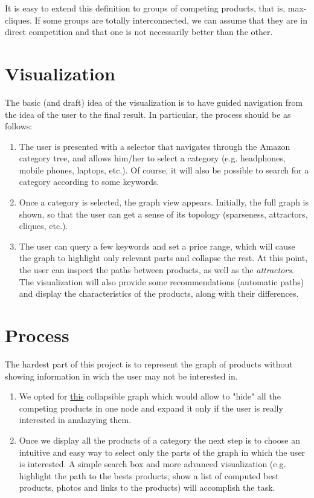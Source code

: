 \documentclass[a4paper,12pt]{article}
\begin{document}
It is easy to extend this definition to groups of competing products, that is, max-cliques. If some groups are totally interconnected, we can assume that they are in direct competition and that one is not necessarily better than the other.

\section{Visualization}
The basic (and draft) idea of the visualization is to have guided navigation from the idea of the user to the final result. In particular, the process should be as follows:
\begin{enumerate}
	\item The user is presented with a selector that navigates through the Amazon category tree, and allows him/her to select a category (e.g. headphones, mobile phones, laptops, etc.). Of course, it will also be possible to search for a category according to some keywords.
	\item Once a category is selected, the graph view appears. Initially, the full graph is shown, so that the user can get a sense of its topology (sparseness, attractors, cliques, etc.).
	\item The user can query a few keywords and set a price range, which will cause the graph to highlight only relevant parts and collapse the rest. At this point, the user can inspect the paths between products, as well as the \emph{attractors}. The visualization will also provide some recommendations (automatic paths) and display the characteristics of the products, along with their differences.
\end{enumerate}

\section{Process}
The hardest part of this project is to represent the graph of products without showing information in wich the user may not be interested in.
\begin{enumerate}
	\item We opted for \href{http://bl.ocks.org/GerHobbelt/3071239}{this} collapsible graph which would allow to "hide" all the competing products in one node and expand it only if the user is really interested in analazying them. 
	\item Once we display all the products of a category the next step is to choose an intuitive and easy way to select only the parts of the graph in which the user is interested. A simple search box and more advanced visualization (e.g. highlight the path to the bests products, show a list of computed best products, photos and links to the products) will accomplish the task.
\end{enumerate}
 
\end{document}
